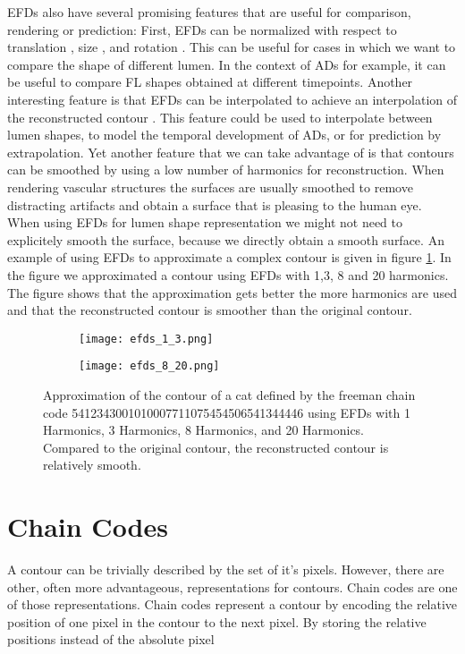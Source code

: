 \documentclass[thesis.tex]{subfiles}
\begin{document}
EFDs also have several promising features that are useful for comparison, rendering or prediction: First, EFDs can be normalized with respect to translation \cite{giardinia}, size \cite{giardinia}, and rotation \cite{lin1987new, giardinia}. This can be useful for cases in which we want to compare the shape of different lumen. In the context of ADs for example, it can be useful to compare FL shapes obtained at different timepoints. Another interesting feature is that EFDs can be interpolated to achieve an interpolation of the reconstructed contour \cite{jeong2007reslicing}. This feature could be used to interpolate between lumen shapes, to model the temporal development of ADs, or for prediction by extrapolation.  Yet another feature that we can take advantage of is that contours can be smoothed by using a low number of harmonics for reconstruction. When rendering vascular structures the surfaces are usually smoothed to remove distracting artifacts and obtain a surface that is pleasing to the human eye. When using EFDs for lumen shape representation we might not need to explicitely smooth the surface, because we directly obtain a smooth surface. 
An example of using EFDs to approximate a complex contour is given in figure \ref{fig:efd_approx}. In the figure we approximated a contour using EFDs with 1,3, 8 and 20 harmonics. The figure shows that the approximation gets better the more harmonics are used and that the reconstructed contour is smoother than the original contour.

\begin{figure}
	\begin{subfigure}[t]{\textwidth}
		\texttt{[image: efds\_1\_3.png]}		
	\end{subfigure}
	\begin{subfigure}[t]{\textwidth}
		\texttt{[image: efds\_8\_20.png]}		
	\end{subfigure}
	\caption{Approximation of the contour of a cat defined by the freeman chain code 5412343001010007711075454506541344446 using EFDs with 1 Harmonics, 3 Harmonics, 8 Harmonics, and 20 Harmonics. Compared to the original contour, the reconstructed contour is relatively smooth.}
\label{fig:efd_approx}
\end{figure}


\section{Chain Codes} \label{chain_codes}
A contour can be trivially described by the set of it's pixels. However, there are other, often more advantageous, representations for contours. Chain codes are one of those representations. Chain codes represent a contour by encoding the relative position of one pixel in the contour to the next pixel. By storing the relative positions instead of the absolute pixel   
\end{document}
